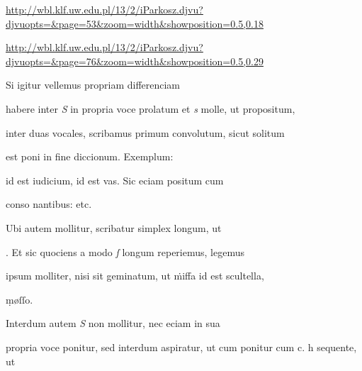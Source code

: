 
\newParkoszpage

{
\url{http://wbl.klf.uw.edu.pl/13/2/iParkosz.djvu?djvuopts=&page=53&zoom=width&showposition=0.5,0.18}

\url{http://wbl.klf.uw.edu.pl/13/2/iParkosz.djvu?djvuopts=&page=76&zoom=width&showposition=0.5,0.29}
}

\bigskip

\obeylines
\mono



\fullpreviouslines


{
\color{blue}



\indentK Si igitur vellemus propriam differenciam 

\fulllines

habere inter \textit{S} in propria voce prolatum et \textit{s} molle, ut propositum,
}


\fulllines

inter duas vocales, scribamus primum convolutum, sicut solitum 

est poni in fine diccionum. Exemplum:    

 id est iudicium,  id est vas. Sic eciam positum cum 

conso nantibus:      etc. 

Ubi autem mollitur, scribatur simplex longum, ut 

. Et sic quociens a modo \textit{ſ} longum reperiemus, legemus

ipsum molliter, nisi sit geminatum, ut ṁiﬀa id est scultella,

\splitlines

ṃøſſo.

\indentK Interdum autem \textit{S} non mollitur, nec eciam in sua

\fulllines

propria voce ponitur, sed interdum aspiratur, ut cum ponitur cum 
 c. h sequente, ut   

\splitlines

